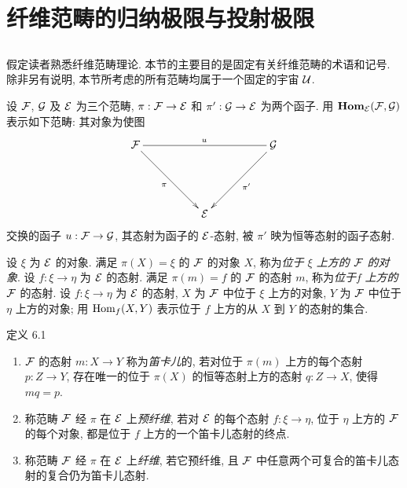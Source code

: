 \section{纤维范畴的归纳极限与投射极限}

\setcounter{subsection}{-1}
\subsection{}

假定读者熟悉纤维范畴理论\cite{sga4.exp.VI.bib.5}.
本节的主要目的是固定有关纤维范畴的术语和记号.
除非另有说明, 本节所考虑的所有范畴均属于一个固定的宇宙 ${\mathcal U}$.

设 ${\mathcal F}$, ${\mathcal G}$ 及 ${\mathcal E}$ 为三个范畴,
$\pi:\Ff\to\Ee$ 和 ${\pi}':\Gg\to\Ee$ 为两个函子.
用 $\operatorname{\mathbf{Hom}}_{{\mathcal E}}({\mathcal F},{\mathcal G})$ 表示如下范畴:
其对象为使图
\[
\xymatrix@=1.75cm{
\Ff \ar@{-}[rr]^{u} \ar[rd]_{\pi}&             &\Gg \ar[ld]^{\pi'}\\
           & \Ee &
}\]
交换的函子 $u:\Ff\to\Gg$,
其态射为函子的 ${\mathcal E}$-态射,
\ie 被 $\pi'$ 映为恒等态射的函子态射.

设 $\xi$ 为 ${\mathcal E}$ 的对象.
满足 $\pi(X)=\xi$ 的 ${\mathcal F}$ 的对象 $X$,
称为\emph{位于 $\xi$ 上方的 ${\mathcal F}$ 的对象}.
设 $f:\xi\to\eta$ 为 ${\mathcal E}$ 的态射.
满足 $\pi(m)=f$ 的 ${\mathcal F}$ 的态射 $m$,
称为\emph{位于}\pageoriginale $f$ \emph{上方的} ${\mathcal F}$ 的态射.
设 $f:\xi\to\eta$ 为 ${\mathcal E}$ 的态射,
$X$ 为 ${\mathcal F}$ 中位于 $\xi$ 上方的对象,
$Y$ 为 ${\mathcal F}$ 中位于 $\eta$ 上方的对象;
用 $\operatorname{Hom}_f(X,Y)$ 表示位于 $f$ 上方的从 $X$ 到 $Y$ 的态射的集合.

\begin{enonce*}{定义 6.1}
\begin{enumerate}
\renewcommand{\labelenumi}{\theenumi)}
\item ${\mathcal F}$ 的态射 $m:X\to Y$ 称为\emph{笛卡儿}的,
若对位于 $\pi(m)$ 上方的每个态射 $p:Z\to Y$,
存在唯一的位于 $\pi(X)$ 的恒等态射上方的态射 $q:Z\to X$,
使得 $mq=p$.

\item 称范畴 ${\mathcal F}$ 经 $\pi$ 在 ${\mathcal E}$ 上\emph{预纤维},
若对 ${\mathcal E}$ 的每个态射 $f:\xi\to\eta$,
位于 $\eta$ 上方的 ${\mathcal F}$ 的每个对象,
都是位于 $f$ 上方的一个笛卡儿态射的终点.

\item 称范畴 ${\mathcal F}$ 经 $\pi$ 在 ${\mathcal E}$ 上\emph{纤维},
若它预纤维, 且 ${\mathcal F}$ 中任意两个可复合的笛卡儿态射的复合仍为笛卡儿态射.
\end{enumerate}
\end{enonce*}

